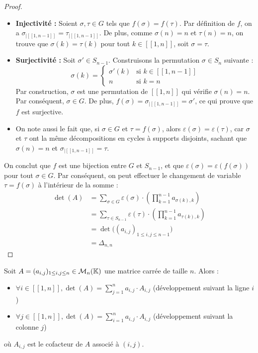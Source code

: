 \documentclass[12pt, a4paper]{report}
\begin{document}
\begin{proof}
    \begin{itemize}
        \item \textbf{Injectivité :} Soient $\sigma, \tau \in G$ tels que $f(\sigma) = f(\tau)$. Par définition de $f$, on a $\sigma_{|[\![1,n-1]\!]} = \tau_{|[\![1,n-1]\!]}$. De plus, comme $\sigma(n) = n$ et $\tau(n) = n$, on trouve que $\sigma(k) = \tau(k)$ pour tout $k \in [\![1,n]\!]$, soit $\sigma = \tau$.
        \item \textbf{Surjectivité :} Soit $\sigma' \in S_{n-1}$. Construisons la permutation $\sigma \in S_n$ suivante :
        $$\sigma(k) = \begin{cases} \sigma'(k) & \text{si } k \in [\![1,n-1]\!] \\ n & \text{si } k = n \end{cases}$$
        Par construction, $\sigma$ est une permutation de $[\![1,n]\!]$ qui vérifie $\sigma(n) = n$. Par conséquent, $\sigma \in G$. De plus, $f(\sigma) = \sigma_{|[\![1,n-1]\!]} = \sigma'$, ce qui prouve que $f$ est surjective.
        \item On note aussi le fait que, si $\sigma \in G$ et $\tau = f(\sigma)$, alors $\varepsilon(\sigma) = \varepsilon(\tau)$, car $\sigma$ et $\tau$ ont la même décompositions en cycles à supports disjoints, sachant que $\sigma(n) = n$ et $\sigma_{|[\![1,n-1]\!]} = \tau$.
    \end{itemize}

    On conclut que $f$ est une bijection entre $G$ et $S_{n-1}$, et que $\varepsilon(\sigma) = \varepsilon(f(\sigma))$ pour tout $\sigma \in G$. Par conséquent, on peut effectuer le changement de variable $\tau = f(\sigma)$ à l'intérieur de la somme :
    \begin{align*}
        \det(A) &= \sum_{\sigma \in G} \varepsilon(\sigma) \cdot \left(\prod_{k=1}^{n-1} a_{\sigma(k), k}\right) \\
        &= \sum_{\tau \in S_{n-1}} \varepsilon(\tau) \cdot \left(\prod_{k=1}^{n-1} a_{\tau(k), k}\right) \\
        &= \det\bigl((a_{i,j})_{1 \le i,j \le n-1}\bigr) \\
        &= \Delta_{n,n}
    \end{align*}
\end{proof}

\begin{property}
    Soit $A = (a_{i,j})_{1 \le i,j \le n} \in \mathcal M_n(\mathbb{K})$ une matrice carrée de taille $n$. Alors :
    \begin{itemize}
        \item $\forall i \in [\![1,n]\!], \det(A) = \sum_{j=1}^{n} a_{i,j} \cdot A_{i,j}$ (développement suivant la ligne $i$)
        \item $\forall j \in [\![1,n]\!], \det(A) = \sum_{i=1}^{n} a_{i,j} \cdot A_{i,j}$ (développement suivant la colonne $j$)
    \end{itemize}
    où $A_{i,j}$ est le cofacteur de $A$ associé à $(i,j)$.
\end{property}
\end{document}
